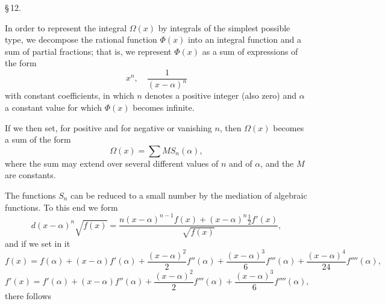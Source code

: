 \begin{center}
\S\,12. \\
\end{center}
In order to represent the integral $\Omega(x)$ by integrals of the simplest possible type, we decompose the rational function $\Phi(x)$ into an integral function and a sum of partial fractions; that is, we represent $\Phi(x)$ as a sum of expressions of the form
\[
x^n, \quad \frac{1}{(x-\alpha)^n}
\]
with constant coefficients, in which $n$ denotes a positive integer (also zero) and $\alpha$ a constant value for which $\Phi(x)$ becomes infinite.

If we then set, for positive and for negative or vanishing $n$,
then $\Omega(x)$ becomes a sum of the form
\[
\Omega(x) = \sum M S_n(\alpha),
\]
where the sum may extend over several different values of $n$ and of $\alpha$, and the $M$ are constants.

The functions $S_n$ can be reduced to a small number by the mediation of algebraic functions. To this end we form
\[
d(x-\alpha)^n\sqrt{f(x)} = \frac{n(x-\alpha)^{n-1}f(x) + (x-\alpha)^n\frac{1}{2}f'(x)}{\sqrt{f(x)}},
\]
and if we set in it
\[
f(x) = f(\alpha) + (x-\alpha)f'(\alpha) + \frac{(x-\alpha)^2}{2}f''(\alpha) + \frac{(x-\alpha)^3}{6}f'''(\alpha) + \frac{(x-\alpha)^4}{24}f''''(\alpha),
\]
\[
f'(x) = f'(\alpha) + (x-\alpha)f''(\alpha) + \frac{(x-\alpha)^2}{2}f'''(\alpha) + \frac{(x-\alpha)^3}{6}f''''(\alpha),
\]
there follows
